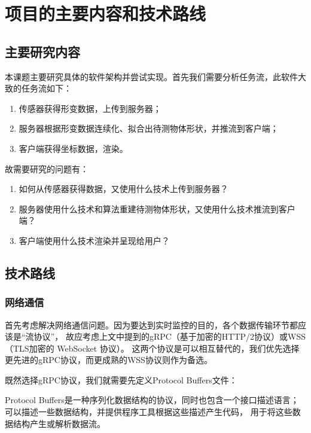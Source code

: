 \section{项目的主要内容和技术路线}
\subsection{主要研究内容}

本课题主要研究具体的软件架构并尝试实现。首先我们需要分析任务流，此软件大致的任务流如下：

\begin{enumerate}
    \item 传感器获得形变数据，上传到服务器；
    \item 服务器根据形变数据连续化、拟合出待测物体形状，并推流到客户端；
    \item 客户端获得坐标数据，渲染。
\end{enumerate}

故需要研究的问题有：

\begin{enumerate}
    \item 如何从传感器获得数据，又使用什么技术上传到服务器？
    \item 服务器使用什么技术和算法重建待测物体形状，又使用什么技术推流到客户端？
    \item 客户端使用什么技术渲染并呈现给用户？
\end{enumerate}

\subsection{技术路线}
\subsubsection{网络通信}

首先考虑解决网络通信问题。因为要达到实时监控的目的，各个数据传输环节都应该是“流协议”，
故应考虑上文中提到的gRPC（基于加密的HTTP/2协议）或WSS（TLS加密的 WebSocket 协议）。
这两个协议是可以相互替代的，我们优先选择更先进的gRPC协议，而更成熟的WSS协议则作为备选。

既然选择gRPC协议，我们就需要先定义Protocol Buffers文件：



Protocol Buffers是一种序列化数据结构的协议，同时也包含一个接口描述语言；
可以描述一些数据结构，并提供程序工具根据这些描述产生代码，
用于将这些数据结构产生或解析数据流。

